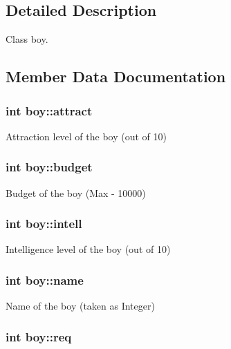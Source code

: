 \subsection{Detailed Description}
Class boy. 

\subsection{Member Data Documentation}
\hypertarget{classboy_ad89bd35b80537ce982b6408703cbf9e7}{
\subsubsection[{attract}]{\setlength{\rightskip}{0pt plus 5cm}int boy\-::attract}}\label{classboy_ad89bd35b80537ce982b6408703cbf9e7}


Attraction level of the boy (out of 10) 

\hypertarget{classboy_a80d6bd6642a612cf0428ab56a2098316}{
\subsubsection[{budget}]{\setlength{\rightskip}{0pt plus 5cm}int boy\-::budget}}\label{classboy_a80d6bd6642a612cf0428ab56a2098316}


Budget of the boy (Max -\/ 10000) 

\hypertarget{classboy_acc48a9f5c15cae36d7319b22057efdcf}{
\subsubsection[{intell}]{\setlength{\rightskip}{0pt plus 5cm}int boy\-::intell}}\label{classboy_acc48a9f5c15cae36d7319b22057efdcf}


Intelligence level of the boy (out of 10) 

\hypertarget{classboy_a28a1e04736fbd9fc28237298b411e7d1}{
\subsubsection[{name}]{\setlength{\rightskip}{0pt plus 5cm}int boy\-::name}}\label{classboy_a28a1e04736fbd9fc28237298b411e7d1}


Name of the boy (taken as Integer) 

\hypertarget{classboy_a9e6ba507f2c7fccefacfb904e8526241}{
\subsubsection[{req}]{\setlength{\rightskip}{0pt plus 5cm}int boy\-::req}}\label{classboy_a9e6ba507f2c7fccefacfb904e8526241}


